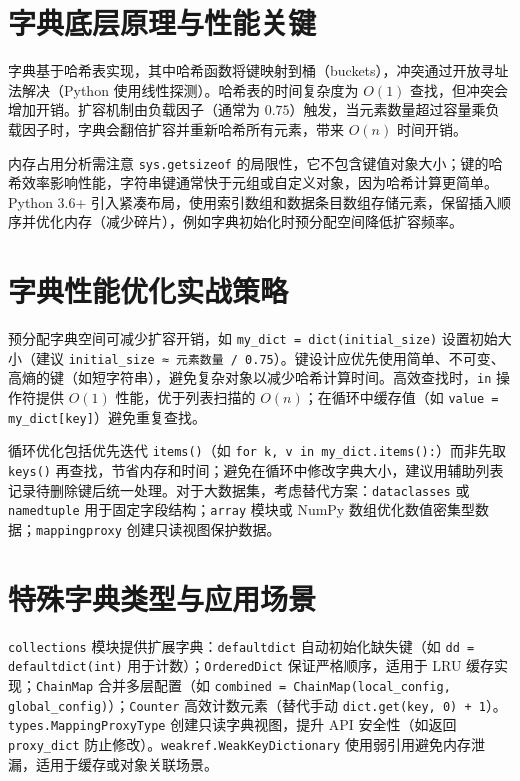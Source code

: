 \chapter{字典底层原理与性能关键}
字典基于哈希表实现，其中哈希函数将键映射到桶（buckets），冲突通过开放寻址法解决（Python 使用线性探测）。哈希表的时间复杂度为 $O(1)$ 查找，但冲突会增加开销。扩容机制由负载因子（通常为 $0.75$）触发，当元素数量超过容量乘负载因子时，字典会翻倍扩容并重新哈希所有元素，带来 $O(n)$ 时间开销。\par
内存占用分析需注意 \texttt{sys.getsizeof} 的局限性，它不包含键值对象大小；键的哈希效率影响性能，字符串键通常快于元组或自定义对象，因为哈希计算更简单。Python 3.6+ 引入紧凑布局，使用索引数组和数据条目数组存储元素，保留插入顺序并优化内存（减少碎片），例如字典初始化时预分配空间降低扩容频率。\par
\chapter{字典性能优化实战策略}
预分配字典空间可减少扩容开销，如 \texttt{my\_{}dict = dict(initial\_{}size)} 设置初始大小（建议 \texttt{initial\_{}size ≈ 元素数量 / 0.75}）。键设计应优先使用简单、不可变、高熵的键（如短字符串），避免复杂对象以减少哈希计算时间。高效查找时，\texttt{in} 操作符提供 $O(1)$ 性能，优于列表扫描的 $O(n)$；在循环中缓存值（如 \texttt{value = my\_{}dict[key]}）避免重复查找。\par
循环优化包括优先迭代 \texttt{items()}（如 \texttt{for k, v in my\_{}dict.items():}）而非先取 \texttt{keys()} 再查找，节省内存和时间；避免在循环中修改字典大小，建议用辅助列表记录待删除键后统一处理。对于大数据集，考虑替代方案：\texttt{dataclasses} 或 \texttt{namedtuple} 用于固定字段结构；\texttt{array} 模块或 NumPy 数组优化数值密集型数据；\texttt{mappingproxy} 创建只读视图保护数据。\par
\chapter{特殊字典类型与应用场景}
\texttt{collections} 模块提供扩展字典：\texttt{defaultdict} 自动初始化缺失键（如 \texttt{dd = defaultdict(int)} 用于计数）；\texttt{OrderedDict} 保证严格顺序，适用于 LRU 缓存实现；\texttt{ChainMap} 合并多层配置（如 \texttt{combined = ChainMap(local\_{}config, global\_{}config)}）；\texttt{Counter} 高效计数元素（替代手动 \texttt{dict.get(key, 0) + 1}）。\texttt{types.MappingProxyType} 创建只读字典视图，提升 API 安全性（如返回 \texttt{proxy\_{}dict} 防止修改）。\texttt{weakref.WeakKeyDictionary} 使用弱引用避免内存泄漏，适用于缓存或对象关联场景。\par
